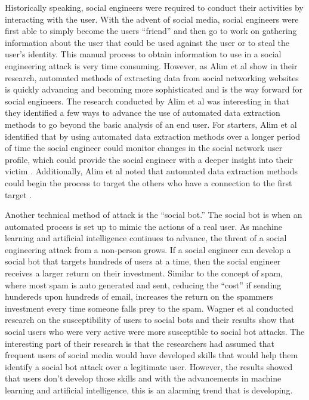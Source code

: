 \documentclass[conference]{IEEEtran}
\begin{document}
Historically speaking, social engineers were required to conduct their activities by interacting with the user.  With the advent of social media, social engineers were first able to simply become the users “friend” and then go to work on gathering information about the user that could be used against the user or to steal the user's identity. This manual process to obtain information to use in a social engineering attack is very time consuming. However, as Alim et al show in their research, automated methods of extracting data from social networking websites is quickly advancing and becoming more sophisticated and is the way forward for social engineers\cite{5402568}.   The research conducted by Alim et al was interesting in that they identified a few ways to advance the use of automated data extraction methods to go beyond the basic analysis of an end user. For starters, Alim et al identified that by using automated data extraction methods over a longer period of time the social engineer could monitor changes in the social network user profile, which could provide the social engineer with a deeper insight into their victim \cite{5402568}.  Additionally, Alim et al noted that automated data extraction methods could begin the process to target the others who have a connection to the first target \cite{5402568}.

Another technical method of attack is the “social bot.” The social bot is when an automated process is set up to mimic the actions of a real user\cite{wagner}. As machine learning and artificial intelligence continues to advance, the threat of a social engineering attack from a non-person grows.  If a social engineer can develop a social bot that targets hundreds of users at a time, then the social engineer receives a larger return on their investment. Similar to the concept of spam, where most spam is auto generated and sent, reducing the “cost” if sending hundereds upon hundreds of email, increases the return on the spammers investment every time someone falls prey to the spam. Wagner et al conducted research on the susceptibility of users to social bots and their results show that social users who were very active were more susceptible to social bot attacks\cite{wagner}.  The interesting part of their research is that the researchers had assumed that frequent users of social media would have developed skills that would help them identify a social bot attack over a legitimate user. However, the results showed that users don't develop those skills and with the advancements in machine learning and artificial intelligence, this is an alarming trend that is developing. 
\end{document}
